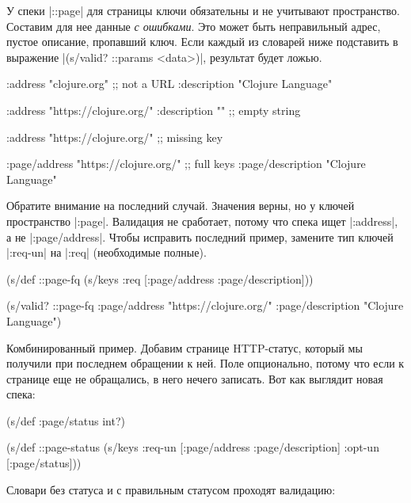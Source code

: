 У спеки \spverb|::page| для страницы ключи обязательны и не учитывают
пространство. Составим для нее данные \emph{с ошибками}. Это может быть
неправильный адрес, пустое описание, пропавший ключ. Если каждый из словарей
ниже подставить в выражение \spverb|(s/valid? ::params <data>)|, результат будет
ложью.

\begin{english}
  \begin{clojure}
{:address "clojure.org" ;; not a URL
 :description "Clojure Language"}

{:address "https://clojure.org/"
 :description ""} ;; empty string

{:address "https://clojure.org/"} ;; missing key

{:page/address "https://clojure.org/" ;; full keys
 :page/description "Clojure Language"}
  \end{clojure}
\end{english}

Обратите внимание на последний случай. Значения верны, но у ключей пространство
\spverb|:page|. Валидация не сработает, потому что спека ищет \spverb|:address|,
а не \spverb|:page/address|. Чтобы исправить последний пример, замените тип
ключей \spverb|:req-un| на \spverb|:req| (необходимые полные).

\begin{english}
  \begin{clojure}
(s/def ::page-fq
  (s/keys :req [:page/address
                :page/description]))

(s/valid? ::page-fq
          {:page/address "https://clojure.org/"
           :page/description "Clojure Language"})
  \end{clojure}
\end{english}

Комбинированный пример. Добавим странице HTTP-статус, который мы получили при
последнем обращении к ней. Поле опционально, потому что если к странице еще не
обращались, в него нечего записать. Вот как выглядит новая спека:

\begin{english}
  \begin{clojure}
(s/def :page/status int?)

(s/def ::page-status
  (s/keys :req-un [:page/address
                   :page/description]
          :opt-un [:page/status]))
  \end{clojure}
\end{english}

Словари без статуса и с правильным статусом проходят валидацию:

